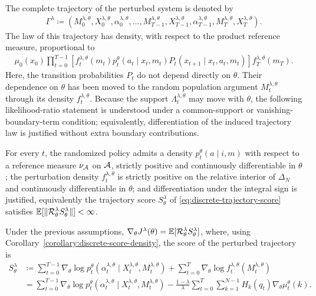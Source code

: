 The complete trajectory of the perturbed system is denoted by
\begin{align}
    \Gamma^\lambda \coloneqq \left(M_0^{\lambda,\theta}, X_0^{\lambda,\theta}, \alpha_0^{\lambda,\theta}, \ldots, M_{T-1}^{\lambda,\theta}, X_{T-1}^{\lambda,\theta}, \alpha_{T-1}^{\lambda,\theta}, M_T^{\lambda,\theta}, X_T^{\lambda,\theta} \right).
\end{align}
The law of this trajectory has density, with respect to the product reference measure, proportional to
\begin{align}
    \mu_0(x_0) \prod_{t=0}^{T-1}\left[f_t^{\lambda,\theta}(m_t) p_t^\theta(a_t\mid x_t, m_t) P_t(x_{t+1}\mid x_t,a_t,m_t) \right] f_T^{\lambda,\theta}(m_T).
\end{align}
Here, the transition probabilities $P_t$ do not depend directly on $\theta$. Their dependence on $\theta$ has been moved to the random population argument $M_t^{\lambda,\theta}$ through its density $f_t^{\lambda,\theta}$. Because the support $\Lambda_t^{\lambda,\theta}$ may move with $\theta$, the following likelihood-ratio statement is understood under a common-support or vanishing-boundary-term condition; equivalently, differentiation of the induced trajectory law is justified without extra boundary contributions.

\begin{assumption}
    For every $t$, the randomized policy admits a density $p_t^\theta(a\mid i,m)$ with respect to a reference measure $\nu_{\cal A}$ on ${\cal A}$, strictly positive and continuously differentiable in $\theta$; the perturbation density $f_t^{\lambda,\theta}$ is strictly positive on the relative interior of $\Delta_N$ and continuously differentiable in $\theta$; and differentiation under the integral sign is justified, equivalently the trajectory score $S_\theta^\lambda$ of \eqref{eq:discrete-trajectory-score} satisfies $\mathbb{E}[\|{\cal R}_\theta^\lambda S_\theta^\lambda\|]<\infty$.
\end{assumption}

\begin{theorem}
    \label{theorem:discrete-policy-gradient-formula}
    Under the previous assumptions, $\nabla_\theta J^\lambda(\theta) = \mathbb{E}[{\cal R}_\theta^\lambda S_\theta^\lambda]$,
    where, using Corollary~\ref{corollary:discrete-score-density}, the score of the perturbed trajectory is
    \begin{align}
        \label{eq:discrete-trajectory-score}
        S_\theta^\lambda
        &\coloneqq \sum_{t=0}^{T-1} \nabla_\theta \log p_t^\theta(\alpha_t^{\lambda,\theta}\mid X_t^{\lambda,\theta}, M_t^{\lambda,\theta}) + \sum_{t=0}^T \nabla_\theta \log f_t^{\lambda,\theta}(M_t^{\lambda,\theta})\\
        &= \sum_{t=0}^{T-1} \nabla_\theta \log p_t^\theta(\alpha_t^{\lambda,\theta}\mid X_t^{\lambda,\theta}, M_t^{\lambda,\theta}) - \frac{1-\lambda}{\lambda} \sum_{t=0}^T \sum_{k=1}^{N-1} H_k(q_t) \nabla_\theta \mu_t^\theta(k).
    \end{align}
\end{theorem}

